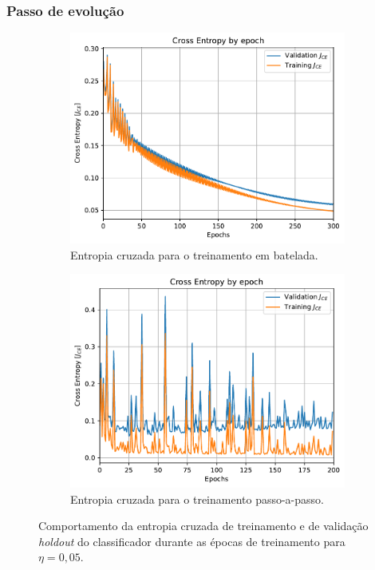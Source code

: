 \subsubsection{Passo de evolução}

\begin{figure}[H]
	\centering
	\begin{subfigure}{0.49\textwidth}
		\includegraphics[width=\linewidth]{img/0-05/CE_by_epoch-Batch-300}
		\caption{Entropia cruzada para o treinamento em batelada.}
		\label{fig:cebyepoch-batch-300-0-05}
	\end{subfigure}
	\begin{subfigure}{0.49\textwidth}
		\includegraphics[width=\linewidth]{img/0-05/CE_by_epoch-Step-200}
		\caption{Entropia cruzada para o treinamento passo-a-passo.}
		\label{fig:cebyepoch-Step-200-0-05}
	\end{subfigure}
	\caption{Comportamento da entropia cruzada de treinamento e de validação \textit{holdout} do classificador durante as épocas de treinamento para $\eta = 0,05$.}
\end{figure}

